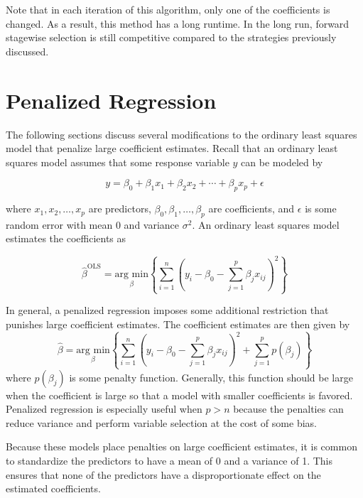 \documentclass{article}
\newcommand{\argmin}[1]{\underset{\beta}{\text{arg min}}}
\begin{document}
Note that in each iteration of this algorithm, only one of the coefficients is changed. As a result, this method has a long runtime. In the long run, forward stagewise selection is still competitive compared to the strategies previously discussed.

\section{Penalized Regression}
The following sections discuss several modifications to the ordinary least squares model that penalize large coefficient estimates. Recall that an ordinary least squares model assumes that some response variable $y$ can be modeled by

\begin{equation}
	y = \beta_0 + \beta_1 x_1 + \beta_2 x_2 + \cdots + \beta_p x_p + \epsilon
\end{equation}

where $x_1, x_2, \dotsc, x_p$ are predictors, $\beta_0, \beta_1, \dotsc, \beta_p$ are coefficients, and $\epsilon$ is some random error with mean 0 and variance $\sigma^2$. An ordinary least squares model estimates the coefficients as

\begin{equation}
	\hat{\beta}^{\text{OLS}} = \argmin{\beta}\left\{\sum_{i=1}^{n} \left( y_i - \beta_0 - \sum_{j=1}^{p} \beta_jx_{ij} \right)^2 \right\}
\end{equation}

In general, a penalized regression imposes some additional restriction that punishes large coefficient estimates. The coefficient estimates are then given by
\begin{equation}
	\hat{\beta} = \argmin{\beta}\left\{ \sum_{i=1}^{n} \left( y_i - \beta_0 - \sum_{j=1}^{p} \beta_jx_{ij} \right)^2 + \sum\limits_{j = 1}^p p(\beta_j) \right\}
\end{equation}
where $p(\beta_j)$ is some penalty function. Generally, this function should be large when the coefficient is large so that a model with smaller coefficients is favored. Penalized regression is especially useful when $p>n$ because the penalties can reduce variance and perform variable selection at the cost of some bias.

Because these models place penalties on large coefficient estimates, it is common to standardize the predictors to have a mean of 0 and a variance of 1. This ensures that none of the predictors have a disproportionate effect on the estimated coefficients.
\end{document}
